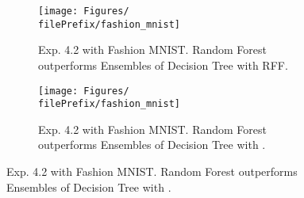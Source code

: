 \begin{figure}[H]
  \centering
  \renewcommand{\filePrefix}{\undPrefix/rff}
  \begin{subfigure}[t]{0.5\linewidth}
    \centering\captionsetup{width=.8\linewidth}\texttt{[image: Figures/\\filePrefix/fashion\_mnist]}
    \caption{Exp. 4.2 with Fashion MNIST. Random Forest outperforms Ensembles of Decision Tree with RFF.}
    \label{fig:\undPrefix_vowel}
  \end{subfigure}%
  \renewcommand{\filePrefix}{\undPrefix/nys}%
  \begin{subfigure}[t]{0.5\linewidth}
    \centering\captionsetup{width=.8\linewidth}\texttt{[image: Figures/\\filePrefix/fashion\_mnist]}
    \caption{Exp. 4.2 with Fashion MNIST. Random Forest outperforms Ensembles of Decision Tree with \Nys.}
    \label{fig:\undPrefix_vowel}
  \end{subfigure}
\end{figure}



